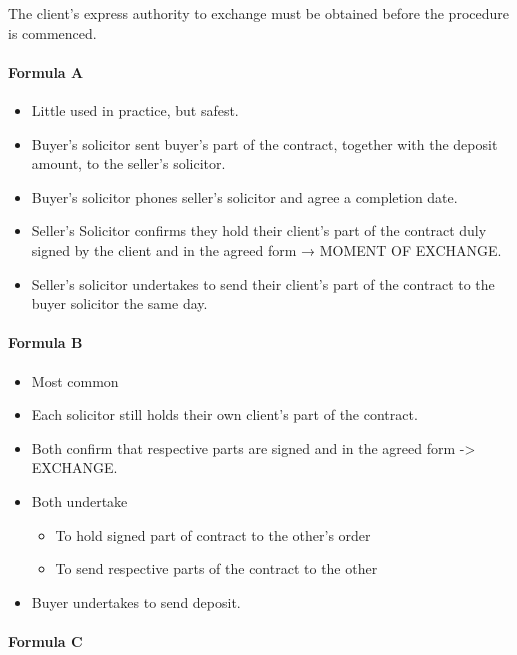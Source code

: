 \documentclass[
]{article}
\providecommand{\tightlist}{%
  \setlength{\itemsep}{0pt}\setlength{\parskip}{0pt}}
\begin{document}
The client's express authority to exchange must be obtained before the
procedure is commenced.

\hypertarget{formula-a}{%
\paragraph{Formula A}\label{formula-a}}

\begin{itemize}
\tightlist
\item
  Little used in practice, but safest.
\item
  Buyer's solicitor sent buyer's part of the contract, together with the
  deposit amount, to the seller's solicitor.
\item
  Buyer's solicitor phones seller's solicitor and agree a completion
  date.
\item
  Seller's Solicitor confirms they hold their client's part of the
  contract duly signed by the client and in the agreed form → MOMENT OF
  EXCHANGE.
\item
  Seller's solicitor undertakes to send their client's part of the
  contract to the buyer solicitor the same day.
\end{itemize}

\hypertarget{formula-b}{%
\paragraph{Formula B}\label{formula-b}}

\begin{itemize}
\tightlist
\item
  Most common
\item
  Each solicitor still holds their own client's part of the contract.
\item
  Both confirm that respective parts are signed and in the agreed form
  -\textgreater{} EXCHANGE.
\item
  Both undertake

  \begin{itemize}
  \tightlist
  \item
    To hold signed part of contract to the other's order
  \item
    To send respective parts of the contract to the other
  \end{itemize}
\item
  Buyer undertakes to send deposit.
\end{itemize}

\hypertarget{formula-c}{%
\paragraph{Formula C}\label{formula-c}}
\end{document}
